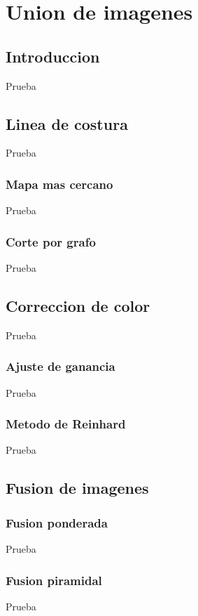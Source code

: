 \chapter{Union de imagenes}
\label{capitulo4}


\section{Introduccion}
Prueba

\section{Linea de costura}
Prueba

\subsection{Mapa mas cercano}
Prueba

\subsection{Corte por grafo}
Prueba

\section{Correccion de color}
Prueba

\subsection{Ajuste de ganancia}
Prueba

\subsection{Metodo de Reinhard}
Prueba

\section{Fusion de imagenes}

\subsection{Fusion ponderada}
Prueba
\subsection{Fusion piramidal}
Prueba




